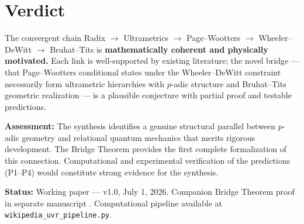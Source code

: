 \documentclass[12pt,a4paper]{article}
\theoremstyle{definition}
\begin{document}
\section{Verdict}

The convergent chain Radix $\to$ Ultrametrics $\to$ Page--Wootters $\to$ Wheeler--DeWitt $\to$ Bruhat--Tits is \textbf{mathematically coherent and physically motivated.} Each link is well-supported by existing literature; the novel bridge --- that Page--Wootters conditional states under the Wheeler--DeWitt constraint necessarily form ultrametric hierarchies with $p$-adic structure and Bruhat--Tits geometric realization --- is a plausible conjecture with partial proof and testable predictions.

\textbf{Assessment:} The synthesis identifies a genuine structural parallel between $p$-adic geometry and relational quantum mechanics that merits rigorous development. The Bridge Theorem provides the first complete formalization of this connection. Computational and experimental verification of the predictions (P1--P4) would constitute strong evidence for the synthesis.

\textbf{Status:} Working paper --- v1.0, July 1, 2026. Companion Bridge Theorem proof in separate manuscript \cite{bridgetheorem}. Computational pipeline available at \texttt{wikipedia\_uvr\_pipeline.py}.
\end{document}

